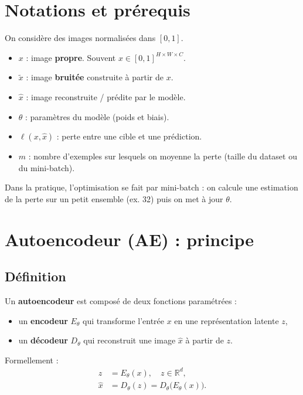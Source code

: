 \documentclass[11pt,a4paper]{article}
\newcommand{\R}{\mathbb{R}}
\begin{document}
\section{Notations et prérequis}

On considère des images normalisées dans $[0,1]$.
\begin{itemize}
  \item $x$ : image \textbf{propre}. Souvent $x \in [0,1]^{H\times W\times C}$.
  \item $\tilde{x}$ : image \textbf{bruitée} construite à partir de $x$.
  \item $\hat{x}$ : image reconstruite / prédite par le modèle.
  \item $\theta$ : paramètres du modèle (poids et biais).
  \item $\ell(x,\hat{x})$ : perte entre une cible et une prédiction.
  \item $m$ : nombre d'exemples sur lesquels on moyenne la perte (taille du dataset ou du mini-batch).
\end{itemize}

Dans la pratique, l'optimisation se fait par mini-batch : on calcule une estimation de la perte sur un petit ensemble (ex. 32) puis on met à jour $\theta$.

\section{Autoencodeur (AE) : principe}

\subsection{Définition}

Un \textbf{autoencodeur} est composé de deux fonctions paramétrées :
\begin{itemize}
  \item un \textbf{encodeur} $E_\theta$ qui transforme l'entrée $x$ en une représentation latente $z$,
  \item un \textbf{décodeur} $D_\theta$ qui reconstruit une image $\hat{x}$ à partir de $z$.
\end{itemize}

Formellement :
\begin{align}
  z &= E_\theta(x), \quad z \in \R^d, \\
  \hat{x} &= D_\theta(z) = D_\theta\big(E_\theta(x)\big).
\end{align}
\end{document}
